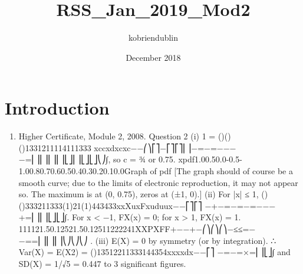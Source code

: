 \documentclass{article}
\title{RSS_Jan_2019_Mod2}
\author{kobriendublin }
\date{December 2018}
\begin{document}
\maketitle

\section{Introduction}

\begin{enumerate}
    \item Higher Certificate, Module 2, 2008. Question 2
(i) 1 = ()()()1331211114111333 xccxdxcxc−−⎛⎞⎡⎤−⎡⎤⎡⎤⎜⎟−=−=−−−−=⎢⎥⎢⎥⎢⎥⎜⎟⎣⎦⎢⎥⎣⎦⎣⎦⎝⎠∫,
so c = ¾ or 0.75.
xpdf1.00.50.0-0.5-1.00.80.70.60.50.40.30.20.10.0Graph of pdf
[The graph should of course be a smooth curve; due to the limits of electronic reproduction, it may not appear so. The maximum is at (0, 0.75), zeros at (±1, 0).]
(ii) For |x| ≤ 1,
()()333211333(1)21(1)443433xxXuxFxuduux−−⎡⎤⎡⎤ −+−=−=−=−−−+=⎢⎥⎢⎥⎣⎦⎣⎦∫.
For x < −1, FX(x) = 0; for x > 1, FX(x) = 1.
111121.50.12521.50.12511222241XXPXFF+−−+−⎛⎞⎛⎞⎛⎞−≤≤=−−==⎜⎟⎜⎟⎜⎟⎝⎠⎝⎠⎝⎠ .
(iii) E(X) = 0 by symmetry (or by integration).
∴ Var(X) = E(X2) = ()13512211333144354xxxxdx−−⎡⎤ −=−=×=⎢⎥⎣⎦∫
and SD(X) = 1/√5 = 0.447 to 3 significant figures.

\end{enumerate}
\end{document}
